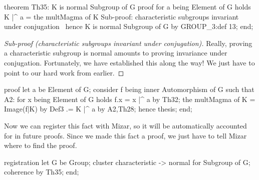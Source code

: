 \nwenddocs{}\endmoddef\nwstartdeflinemarkup{}\nwenddeflinemarkup
theorem Th35:
  K is normal Subgroup of G
proof
  for a being Element of G holds K |^ a = the multMagma of K
  \LA{}Sub-proof: characteristic subgroups invariant under conjugation~{\nwtagstyle{}}\RA{}
  hence K is normal Subgroup of G by GROUP_3:def 13;
end;
\eatline
{}\nwendcode{}\nwdocspar
\begin{proof}[Sub-proof (characteristic subgroups invariant under conjugation)]
Really, proving a characteristic subgroup is normal amounts to proving
invariance under conjugation. Fortunately, we have established this
along the way! We just have to point to our hard work from earlier.
\end{proof}

\nwenddocs{}\endmoddef\nwstartdeflinemarkup{}\nwenddeflinemarkup
proof
  let a be Element of G;
  consider f being inner Automorphism of G such that
  A2: for x being Element of G holds f.x = x |^ a
  by Th32;
  the multMagma of K = Image(f|K) by Def3
                    .= K |^ a by A2,Th28;
  hence thesis;
end;
\nwendcode{}\nwdocspar

\begin{registration}
Now we can register this fact with Mizar, so it will be automatically
accounted for in future proofs. Since we made this fact a proof, we just
have to tell Mizar where to find the proof.
\end{registration}

\nwenddocs{}\endmoddef\nwstartdeflinemarkup{}\nwenddeflinemarkup
registration
  let G be Group;
  cluster characteristic -> normal for Subgroup of G;
  coherence by Th35;
end;
\nwendcode{}\nwdocspar

